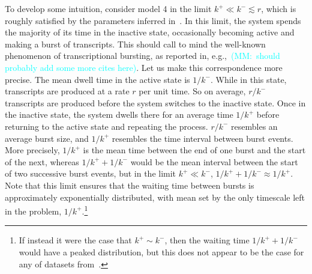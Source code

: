 \documentclass[12pt]{article}%
\newcommand{\mmnote}[1]{\textcolor{cyan}{(MM:~#1)}}
\begin{document}
To develop some intuition, consider model 4 in the limit
$k^+ \ll k^- \lesssim r$, which is roughly satisfied by the
parameters inferred in~\cite{Razo-Mejia2020}.
In this limit, the system spends the majority of its time in the inactive state, occasionally becoming active and making a burst of transcripts.
This should call to mind the well-known phenomenon of transcriptional bursting, as reported in, e.g.,~\cite{Golding2005,Chong2014,Sevier2016}\mmnote{should probably add some more cites here}.
Let us make this correspondence more precise.
The mean dwell time in the active state is $1/k^-$.
While in this state, transcripts are produced at a rate $r$ per
unit time. So on average, $r/k^-$ transcripts are produced before
the system switches to the inactive state. Once in the inactive
state, the system dwells there for an average time $1/k^+$ before
returning to the active state and repeating the process. $r/k^-$
resembles an average burst size, and $1/k^+$ resembles the time
interval between burst events. More precisely, $1/k^+$ is the
mean time between the end of one burst and the start of the next,
whereas $1/k^+ + 1/k^-$ would be the mean interval between the
start of two successive burst events, but in the limit $k^+ \ll
k^-$, $1/k^+ + 1/k^- \approx 1/k^+$. Note that this limit ensures
that the waiting time between bursts is approximately
exponentially distributed, with mean set by the only timescale
left in the problem,
$1/k^+$.\footnote{
If instead it were the case that $k^+ \sim k^-$, then the waiting time
$1/k^+ + 1/k^-$ would have a peaked distribution, but this does
not appear to be the case for any of datasets
from~\cite{Jones2014}.}
\end{document}
